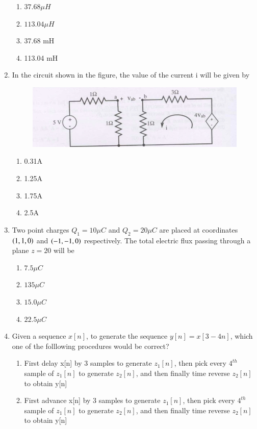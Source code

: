 \documentclass[journal,12pt,onecolumn]{IEEEtran}
\theoremstyle{remark}
\begin{document}
\begin{enumerate}
      \begin{enumerate}
      \item $37.68\mu H$
      \item $113.04\mu H$
      \item 37.68 mH
      \item 113.04 mH
      \end{enumerate}
      \item In the circuit shown in the figure, the value of the current i will be given by
      \begin{figure}[h!]
      \centering
      \includegraphics[width=0.7\linewidth]{figs/fig4.jpg}
      \label{fig:11011}
      \end{figure}
      \begin{enumerate}
          \item 0.31A
          \item 1.25A
          \item 1.75A
          \item 2.5A
      \end{enumerate}
      \item Two point charges $Q_1=10\mu C$ and $Q_2=20 \mu C$ are placed at coordinates $\left(1,1,0\right)$ and $\left(-1,-1,0\right)$ respectively. The total electric flux passing through a plane $z=20$ will be
      \begin{enumerate}
          \item $7.5\mu C$
          \item $135 \mu C$
          \item $15.0 \mu C$
          \item $22.5 \mu C$
      \end{enumerate}
      \item Given a sequence $x[n]$, to generate the sequence $y[n]=x[3-4n]$, which one of the folllowing procedures would be correct?
      \begin{enumerate}
          \item First delay x[n] by 3 samples to generate $z_1[n]$, then pick every $4^{th}$ sample of $z_1[n]$ to generate $z_2[n]$, and then finally time reverse $z_2[n]$ to obtain y[n]
          \item First advance x[n] by 3 samples to generate $z_1[n]$, then pick every $4^{th}$ sample of $z_1[n]$ to generate $z_2[n]$, and then finally time reverse $z_2[n]$ to obtain y[n]

\end{enumerate}
\end{enumerate}
\end{document}
